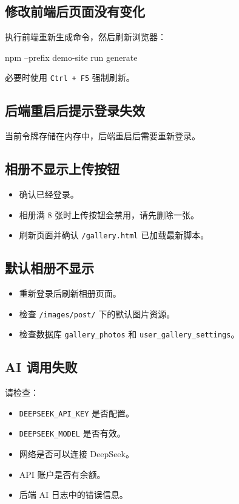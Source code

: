 \documentclass[UTF8,a4paper,12pt]{ctexart}
\newcommand{\code}[1]{\texttt{#1}}
\begin{document}
\subsection{修改前端后页面没有变化}

执行前端重新生成命令，然后刷新浏览器：

\begin{codeblock}
npm --prefix demo-site run generate
\end{codeblock}

必要时使用 \code{Ctrl + F5} 强制刷新。

\subsection{后端重启后提示登录失效}

当前令牌存储在内存中，后端重启后需要重新登录。

\subsection{相册不显示上传按钮}

\begin{itemize}
  \item 确认已经登录。
  \item 相册满 8 张时上传按钮会禁用，请先删除一张。
  \item 刷新页面并确认 \code{/gallery.html} 已加载最新脚本。
\end{itemize}

\subsection{默认相册不显示}

\begin{itemize}
  \item 重新登录后刷新相册页面。
  \item 检查 \code{/images/post/} 下的默认图片资源。
  \item 检查数据库 \code{gallery\_photos} 和 \code{user\_gallery\_settings}。
\end{itemize}

\subsection{AI 调用失败}

请检查：

\begin{itemize}
  \item \code{DEEPSEEK\_API\_KEY} 是否配置。
  \item \code{DEEPSEEK\_MODEL} 是否有效。
  \item 网络是否可以连接 DeepSeek。
  \item API 账户是否有余额。
  \item 后端 AI 日志中的错误信息。
\end{itemize}
\end{document}
